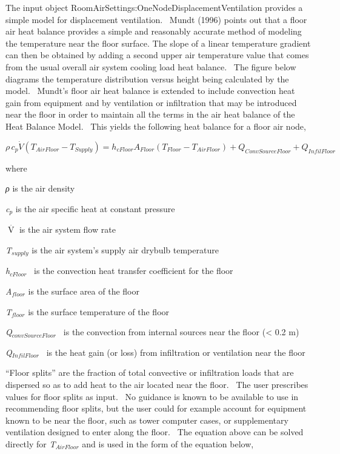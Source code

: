 The input object RoomAirSettings:OneNodeDisplacementVentilation provides a simple model for displacement ventilation.~ Mundt (1996) points out that a floor air heat balance provides a simple and reasonably accurate method of modeling the temperature near the floor surface. The slope of a linear temperature gradient can then be obtained by adding a second upper air temperature value that comes from the usual overall air system cooling load heat balance.~ The figure below diagrams the temperature distribution versus height being calculated by the model.~ Mundt's floor air heat balance is extended to include convection heat gain from equipment and by ventilation or infiltration that may be introduced near the floor in order to maintain all the terms in the air heat balance of the Heat Balance Model.~ This yields the following heat balance for a floor air node,

\begin{equation}
\rho \,{c_p}\dot V({T_{AirFloor}} - {T_{Supply}}) = {h_{cFloor}}{A_{Floor}}({T_{Floor}} - {T_{AirFloor}}) + {Q_{ConvSourceFloor}} + {Q_{InfilFloor}}
\end{equation}

where

\emph{ρ} is the air density

\emph{c\(_{p}\)} is the air specific heat at constant pressure

\(\mathop V\limits^\cdot\) is the air system flow rate

\emph{T\(_{supply}\)} is the air system's supply air drybulb temperature

\emph{h\(_{cFloor}\)} ~is the convection heat transfer coefficient for the floor

\emph{A\(_{floor}\)} is the surface area of the floor

\emph{T\(_{floor}\)} is the surface temperature of the floor

\emph{Q\(_{convSourceFloor}\)~} is the convection from internal sources near the floor (\textless{} 0.2 m)

\emph{Q\(_{InfilFloor}\)}~ is the heat gain (or loss) from infiltration or ventilation near the floor

``Floor splits'' are the fraction of total convective or infiltration loads that are dispersed so as to add heat to the air located near the floor.~ The user prescribes values for floor splits as input.~ No guidance is known to be available to use in recommending floor splits, but the user could for example account for equipment known to be near the floor, such as tower computer cases, or supplementary ventilation designed to enter along the floor.~ The equation above can be solved directly for \emph{T\(_{AirFloor}\)} and is used in the form of the equation below,

